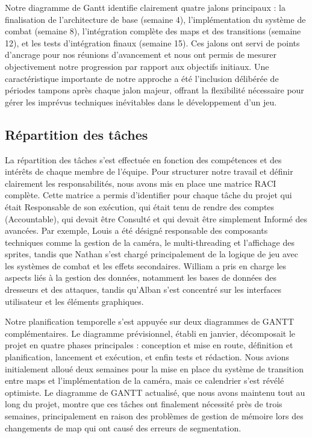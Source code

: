 \documentclass[12pt,a4paper, twoside]{article}
\begin{document}
Notre diagramme de Gantt identifie clairement quatre jalons principaux : la finalisation de l'architecture de base (semaine 4), l'implémentation du système de combat (semaine 8), l'intégration complète des maps et des transitions (semaine 12), et les tests d'intégration finaux (semaine 15). Ces jalons ont servi de points d'ancrage pour nos réunions d'avancement et nous ont permis de mesurer objectivement notre progression par rapport aux objectifs initiaux. Une caractéristique importante de notre approche a été l'inclusion délibérée de périodes tampons après chaque jalon majeur, offrant la flexibilité nécessaire pour gérer les imprévus techniques inévitables dans le développement d'un jeu.

\subsection{Répartition des tâches}
La répartition des tâches s'est effectuée en fonction des compétences et des intérêts de chaque membre de l'équipe. Pour structurer notre travail et définir clairement les responsabilités, nous avons mis en place une matrice RACI complète. Cette matrice a permis d'identifier pour chaque tâche du projet qui était Responsable de son exécution, qui était tenu de rendre des comptes (Accountable), qui devait être Consulté et qui devait être simplement Informé des avancées. Par exemple, Louis a été désigné responsable des composants techniques comme la gestion de la caméra, le multi-threading et l'affichage des sprites, tandis que Nathan s'est chargé principalement de la logique de jeu avec les systèmes de combat et les effets secondaires. William a pris en charge les aspects liés à la gestion des données, notamment les bases de données des dresseurs et des attaques, tandis qu'Alban s'est concentré sur les interfaces utilisateur et les éléments graphiques.

Notre planification temporelle s'est appuyée sur deux diagrammes de GANTT complémentaires. Le diagramme prévisionnel, établi en janvier, décomposait le projet en quatre phases principales : conception et mise en route, définition et planification, lancement et exécution, et enfin tests et rédaction. Nous avions initialement alloué deux semaines pour la mise en place du système de transition entre maps et l'implémentation de la caméra, mais ce calendrier s'est révélé optimiste. Le diagramme de GANTT actualisé, que nous avons maintenu tout au long du projet, montre que ces tâches ont finalement nécessité près de trois semaines, principalement en raison des problèmes de gestion de mémoire lors des changements de map qui ont causé des erreurs de segmentation.
\end{document}
